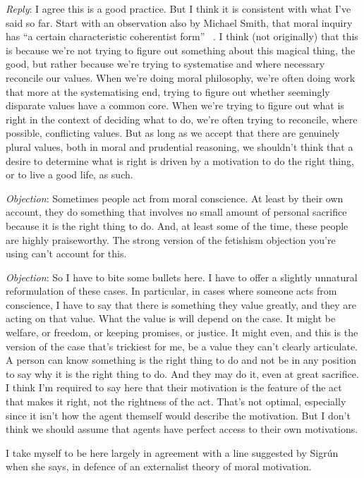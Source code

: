 \emph{Reply}: I agree this is a good practice. But I think it is consistent with what I've said so far. Start with an observation also by Michael Smith, that moral inquiry has ``a certain characteristic coherentist form'' ~\citep[40--41]{Smith1994}. I think (not originally) that this is because we're not trying to figure out something about this magical thing, the good, but rather because we're trying to systematise and where necessary reconcile our values. When we're doing moral philosophy, we're often doing work that more at the systematising end, trying to figure out whether seemingly disparate values have a common core. When we're trying to figure out what is right in the context of deciding what to do, we're often trying to reconcile, where possible, conflicting values. But as long as we accept that there are genuinely plural values, both in moral and prudential reasoning, we shouldn't think that a desire to determine what is right is driven by a motivation to do the right thing, or to live a good life, as such. 

\emph{Objection}: Sometimes people act from moral conscience. At least by their own account, they do something that involves no small amount of personal sacrifice because it is the right thing to do. And, at least some of the time, these people are highly praiseworthy. The strong version of the fetishism objection you're using can't account for this.

\emph{Objection}: So I have to bite some bullets here. I have to offer a slightly unnatural reformulation of these cases. In particular, in cases where someone acts from conscience, I have to say that there is something they value greatly, and they are acting on that value. What the value is will depend on the case. It might be welfare, or freedom, or keeping promises, or justice. It might even, and this is the version of the case that's trickiest for me, be a value they can't clearly articulate. A person can know something is the right thing to do and not be in any position to say why it is the right thing to do. And they may do it, even at great sacrifice. I think I'm required to say here that their motivation is the feature of the act that makes it right, not the rightness of the act. That's not optimal, especially since it isn't how the agent themself would describe the motivation. But I don't think we should assume that agents have perfect access to their own motivations. 

I take myself to be here largely in agreement with a line suggested by Sigrún  \citet{Svavarsdottir1999} when she says, in defence of an externalist theory of moral motivation.

